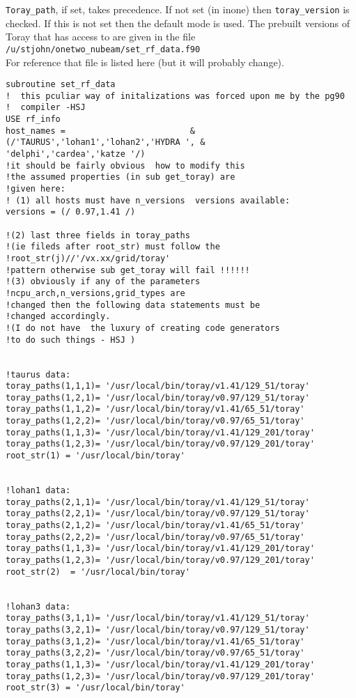\texttt{Toray\_path}, if set, takes precedence. If not set (in inone) then
\texttt{toray\_version} is checked. If this is not set then the default mode is
used. The prebuilt versions of Toray that \ot has access to are given in the
file  \\
\texttt{/u/stjohn/onetwo\_nubeam/set\_rf\_data.f90  }\\
For reference that file is listed here (but it will probably change).
\tiny
\begin{verbatim}
subroutine set_rf_data
!  this pculiar way of initalizations was forced upon me by the pg90
!  compiler -HSJ
USE rf_info
host_names =                         &
(/'TAURUS','lohan1','lohan2','HYDRA ', &
'delphi','cardea','katze '/)
!it should be fairly obvious  how to modify this
!the assumed properties (in sub get_toray) are
!given here:
! (1) all hosts must have n_versions  versions available:
versions = (/ 0.97,1.41 /) 

!(2) last three fields in toray_paths 
!(ie fileds after root_str) must follow the
!root_str(j)//'/vx.xx/grid/toray' 
!pattern otherwise sub get_toray will fail !!!!!!
!(3) obviously if any of the parameters 
!ncpu_arch,n_versions,grid_types are 
!changed then the following data statements must be
!changed accordingly. 
!(I do not have  the luxury of creating code generators
!to do such things - HSJ )


!taurus data:
toray_paths(1,1,1)= '/usr/local/bin/toray/v1.41/129_51/toray'
toray_paths(1,2,1)= '/usr/local/bin/toray/v0.97/129_51/toray' 
toray_paths(1,1,2)= '/usr/local/bin/toray/v1.41/65_51/toray'
toray_paths(1,2,2)= '/usr/local/bin/toray/v0.97/65_51/toray'  
toray_paths(1,1,3)= '/usr/local/bin/toray/v1.41/129_201/toray'
toray_paths(1,2,3)= '/usr/local/bin/toray/v0.97/129_201/toray'  
root_str(1) = '/usr/local/bin/toray' 


!lohan1 data:
toray_paths(2,1,1)= '/usr/local/bin/toray/v1.41/129_51/toray'
toray_paths(2,2,1)= '/usr/local/bin/toray/v0.97/129_51/toray' 
toray_paths(2,1,2)= '/usr/local/bin/toray/v1.41/65_51/toray'
toray_paths(2,2,2)= '/usr/local/bin/toray/v0.97/65_51/toray' 
toray_paths(1,1,3)= '/usr/local/bin/toray/v1.41/129_201/toray'
toray_paths(1,2,3)= '/usr/local/bin/toray/v0.97/129_201/toray' 
root_str(2)  = '/usr/local/bin/toray' 


!lohan3 data:
toray_paths(3,1,1)= '/usr/local/bin/toray/v1.41/129_51/toray'
toray_paths(3,2,1)= '/usr/local/bin/toray/v0.97/129_51/toray' 
toray_paths(3,1,2)= '/usr/local/bin/toray/v1.41/65_51/toray'
toray_paths(3,2,2)= '/usr/local/bin/toray/v0.97/65_51/toray'
toray_paths(1,1,3)= '/usr/local/bin/toray/v1.41/129_201/toray'
toray_paths(1,2,3)= '/usr/local/bin/toray/v0.97/129_201/toray'   
root_str(3) = '/usr/local/bin/toray' 


\end{verbatim}
